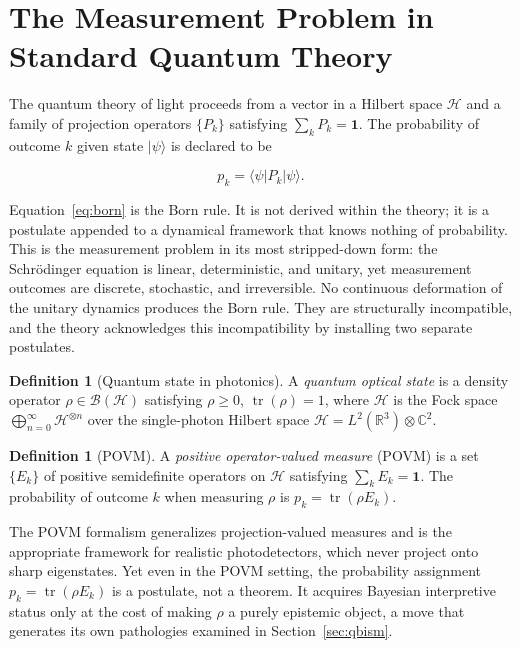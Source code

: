 \documentclass[11pt, openright, twoside]{book}
\theoremstyle{plain}
\theoremstyle{definition}
\newtheorem{definition}[theorem]{Definition}
\theoremstyle{remark}
\begin{document}
\section{The Measurement Problem in Standard Quantum Theory}

The quantum theory of light proceeds from a vector in a Hilbert space $\mathcal{H}$ and a
family of projection operators $\{P_k\}$ satisfying $\sum_k P_k = \mathbf{1}$. The probability
of outcome $k$ given state $|\psi\rangle$ is declared to be

\begin{equation}
  p_k = \langle \psi | P_k | \psi \rangle.
  \label{eq:born}
\end{equation}

Equation~\eqref{eq:born} is the Born rule. It is not derived within the theory; it is a
postulate appended to a dynamical framework that knows nothing of probability. This is the
measurement problem in its most stripped-down form: the Schr\"{o}dinger equation is linear,
deterministic, and unitary, yet measurement outcomes are discrete, stochastic, and irreversible.
No continuous deformation of the unitary dynamics produces the Born rule. They are structurally
incompatible, and the theory acknowledges this incompatibility by installing two separate
postulates.

\begin{definition}[Quantum state in photonics]
A \emph{quantum optical state} is a density operator $\rho \in \mathcal{B}(\mathcal{H})$
satisfying $\rho \geq 0$, $\operatorname{tr}(\rho) = 1$, where $\mathcal{H}$ is the Fock space
$\bigoplus_{n=0}^{\infty} \mathcal{H}^{\otimes n}$ over the single-photon Hilbert space
$\mathcal{H} = L^2(\mathbb{R}^3) \otimes \mathbb{C}^2$.
\end{definition}

\begin{definition}[POVM]
A \emph{positive operator-valued measure} (POVM) is a set $\{E_k\}$ of positive semidefinite
operators on $\mathcal{H}$ satisfying $\sum_k E_k = \mathbf{1}$. The probability of outcome
$k$ when measuring $\rho$ is $p_k = \operatorname{tr}(\rho E_k)$.
\end{definition}

The POVM formalism generalizes projection-valued measures and is the appropriate framework for
realistic photodetectors, which never project onto sharp eigenstates. Yet even in the POVM
setting, the probability assignment $p_k = \operatorname{tr}(\rho E_k)$ is a postulate, not a
theorem. It acquires Bayesian interpretive status only at the cost of making $\rho$ a purely
epistemic object, a move that generates its own pathologies examined in Section~\ref{sec:qbism}.
\end{document}
